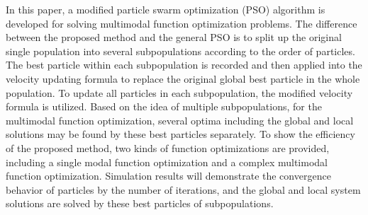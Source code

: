 \cite{PSO_IMPORTANT} 
In this paper, a modified particle swarm optimization (PSO) algorithm is developed for 
solving multimodal function optimization problems. The difference between the proposed 
method and the general PSO is to split up the original single population into several 
subpopulations according to the order of particles. The best particle within each 
subpopulation is recorded and then applied into the velocity updating formula to replace 
the original global best particle in the whole population. To update all particles in 
each subpopulation, the modified velocity formula is utilized. Based on the idea of 
multiple subpopulations, for the multimodal function optimization, several optima 
including the global and local solutions may be found by these best particles 
separately. To show the efficiency of the proposed method, two kinds of function 
optimizations are provided, including a single modal function optimization and a complex 
multimodal function optimization. Simulation results will demonstrate the convergence 
behavior of particles by the number of iterations, and the global and local system 
solutions are solved by these best particles of subpopulations.